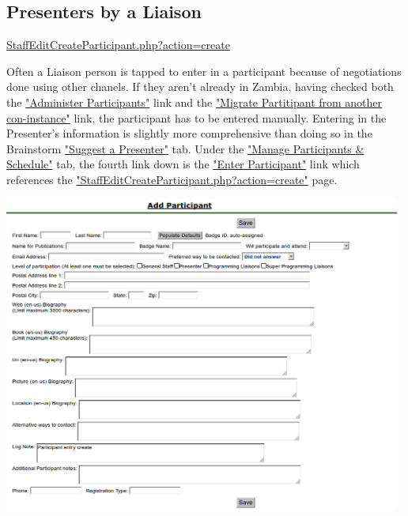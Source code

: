 \documentclass[captions=tablesignature]{scrartcl}
\begin{document}
\subsection{Presenters by a Liaison}
\label{sec-2-3}
\href{../webpages/StaffEditCreateParticipant.php?action=create}{StaffEditCreateParticipant.php?action=create}

Often a Liaison person is tapped to enter in a participant because
of negotiations done using other chanels.  If they aren't already
in Zambia, having checked both the \href{../webpages/AdminParticipants.php}{"Administer Participants"} link
and the \href{../webpages/StaffEditCreateParticipant.php?action=migrate}{"Migrate Partitipant from another con-instance"} link, the
participant has to be entered manually.  Entering in the Presenter's
information is slightly more comprehensive than doing so in the
Brainstorm \href{../webpages/BrainstormSuggestPresenter.php}{"Suggest a Presenter"} tab.  Under the
\href{../webpages/StaffManageParticipants.php}{"Manage Participants \& Schedule"} tab, the fourth link down is the
\href{../webpages/StaffEditCreateParticipant.php?action=create}{"Enter Participant"} link which references the
\href{../webpages/StaffEditCreateParticipant.php?action=create}{"StaffEditCreateParticipant.php?action=create"} page.

\includegraphics[width=0.98\textwidth]{./Images/Add_Participant.png}
\end{document}
